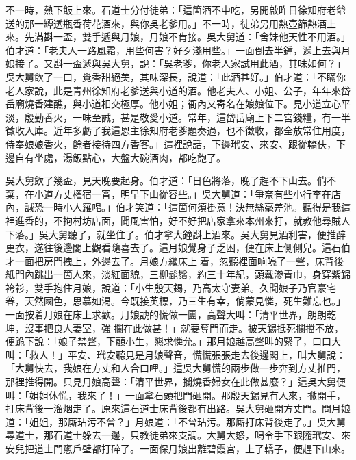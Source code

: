 不一時，熱下飯上來。石道士分付徒弟：「這箇酒不中吃，另開啟昨日徐知府老爺送的那一罈透瓶香荷花酒來，與你吳老爹用。」不一時，徒弟另用熱壺篩熱酒上來。先滿斟一盃，雙手遞與月娘，{}月娘不肯接。吳大舅道：「舍妹他天性不用酒。」伯才道：「老夫人一路風霜，用些何害？好歹淺用些。」一面倒去半鍾，遞上去與月娘接了。又斟一盃遞與吳大舅，說：「吳老爹，你老人家試用此酒，其味如何？」吳大舅飲了一口，覺香甜絕美，其味深長，說道：「此酒甚好。」伯才道：「不瞞你老人家說，此是青州徐知府老爹送與小道的酒。他老夫人、小姐、公子，年年來岱岳廟燒香建醮，與小道相交極厚。他小姐；衙內又寄名在娘娘位下。見小道立心平淡，殷勤香火，一味至誠，甚是敬愛小道。常年，這岱岳廟上下二宮錢糧，有一半徵收入庫。近年多虧了我這恩主徐知府老爹題奏過，也不徵收，都全放常住用度，侍奉娘娘香火，餘者接待四方香客。」{}這裡說話，下邊玳安、來安、跟從轎伕，下邊自有坐處，湯飯點心，大盤大碗酒肉，都吃飽了。

吳大舅飲了幾盃，見天晚要起身。伯才道：「日色將落，晚了趕不下山去。{}倘不棄，在小道方丈權宿一宵，明早下山從容些。」吳大舅道：「爭奈有些小行李在店內，誠恐一時小人羅唣。」伯才笑道：「這箇何須掛意！決無絲毫差池。聽得是我這裡進香的，不拘村坊店面，聞風害怕，好不好把店家拿來本州來打，就教他尋賊人下落。」{}吳大舅聽了，就坐住了。伯才拿大鐘斟上酒來。吳大舅見酒利害，便推醉更衣，{}遂往後邊閣上觀看隨喜去了。這月娘覺身子乏困，便在床上側側兒。這石伯才一面把房門拽上，外邊去了。月娘方纔床上𢱉着，忽聽裡面响喨了一聲，床背後紙門內跳出一箇人來，淡紅面貌，三柳髭鬚，約三十年紀，頭戴滲青巾，身穿紫錦袴衫，雙手抱住月娘，說道：「小生殷天錫，乃高太守妻弟。久聞娘子乃官豪宅眷，天然國色，思慕如渴。今既接英標，乃三生有幸，倘蒙見憐，死生難忘也。」{}一面按着月娘在床上求歡。月娘諕的慌做一團，高聲大叫：「清平世界，朗朗乾坤，沒事把良人妻室，強𢺞攔在此做甚！」就要奪門而走。被天錫抵死攔擋不放，便跪下說：「娘子禁聲，下顧小生，懇求憐允。」{}那月娘越高聲叫的緊了，口口大叫：「救人！」平安、玳安聽見是月娘聲音，慌慌張張走去後邊閣上，叫大舅說：「大舅快去，我娘在方丈和人合口哩。」這吳大舅慌的兩步做一步奔到方丈推門，那裡推得開。只見月娘高聲：「清平世界，攔燒香婦女在此做甚麼？」這吳大舅便叫：「姐姐休慌，我來了！」一面拿石頭把門砸開。那殷天錫見有人來，撇開手，打床背後一溜烟走了。原來這石道士床背後都有出路。吳大舅砸開方丈門。問月娘道：「姐姐，那厮玷污不曾？」月娘道：「不曾玷污。那厮打床背後走了。」吳大舅尋道士，那石道士躲去一邊，只教徒弟來支調。大舅大怒，喝令手下跟隨玳安、來安兒把道士門窻戶壁都打碎了。一面保月娘出離碧霞宮，上了轎子，便趕下山來。


